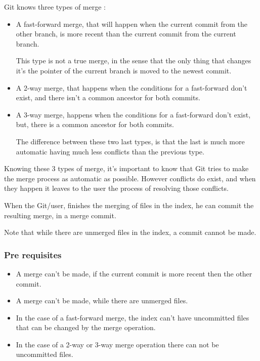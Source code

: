 Git knows three types of merge : 
\begin{itemize}
\item A fast-forward merge, that will happen when 
the current commit from the other
branch, is more recent than the current commit from the current branch. \par
This type is not a true merge, in the sense that the only thing that
changes it's the pointer of the current branch
is moved to the newest commit.

\item A 2-way merge, that happens when the conditions for a fast-forward
don't exist, and there isn't a common ancestor for both commits.

\item A 3-way merge, happens when the conditions for a fast-forward
don't exist, but, there is a common ancestor for both commits. \par
The difference between these two last types, is that the last is much 
more automatic having much less conflicts than the previous type.
\end{itemize}
Knowing these 3 types of merge, it's important to know that Git tries to make
the merge process as automatic as possible. However conflicts do exist, and when
they happen it leaves to the user the process of resolving those conflicts. \par
When the Git/user, finishes the merging of files in the index, he
can commit the resulting merge, in a merge commit. \par
Note that while there are unmerged files in the index, a commit cannot be
made. \par 

\subsubsection{Pre requisites}

\begin{itemize}
\item A merge can't be made, if the current commit is more recent then the
other commit.
\item A merge can't be made, while there are unmerged files.
\item In the case of a fast-forward merge, the index can't have uncommitted
files that can be changed by the merge operation.
\item In the case of a 2-way or 3-way merge operation there can not be
uncommitted files. 
\end{itemize}

